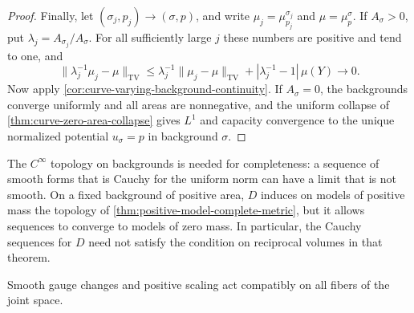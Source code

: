 \begin{proof}
Finally, let $(\sigma_j,p_j)\to(\sigma,p)$, and write $\mu_j=\mu_{p_j}^{\sigma_j}$ and $\mu=\mu_p^\sigma$. If $A_\sigma>0$, put $\lambda_j=A_{\sigma_j}/A_\sigma$. For all sufficiently large $j$ these numbers are positive and tend to one, and
\[
 \|\lambda_j^{-1}\mu_j-\mu\|_{\mathrm{TV}}
 \leq\lambda_j^{-1}\|\mu_j-\mu\|_{\mathrm{TV}}
                  +|\lambda_j^{-1}-1|\,\mu(Y)\longrightarrow0.
\]
Now apply \cref{cor:curve-varying-background-continuity}. If $A_\sigma=0$, the backgrounds converge uniformly and all areas are nonnegative, and the uniform collapse of \cref{thm:curve-zero-area-collapse} gives $L^1$ and capacity convergence to the unique normalized potential $u_\sigma=p$ in background $\sigma$.
\end{proof}

The $C^\infty$ topology on backgrounds is needed for completeness: a sequence of smooth forms that is Cauchy for the uniform norm can have a limit that is not smooth. On a fixed background of positive area, $D$ induces on models of positive mass the topology of \cref{thm:positive-model-complete-metric}, but it allows sequences to converge to models of zero mass. In particular, the Cauchy sequences for $D$ need not satisfy the condition on reciprocal volumes in that theorem.

Smooth gauge changes and positive scaling act compatibly on all fibers of the joint space.

